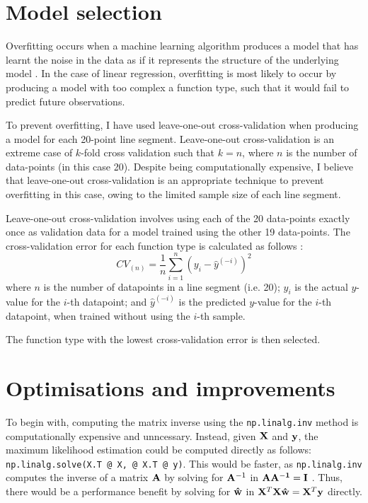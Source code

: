 \documentclass[onecolumn, 12pt, a4paper]{article}
\begin{document}
\section{Model selection}

Overfitting occurs when a machine learning algorithm
produces a model that has learnt the noise in the data
as if it represents the structure of the underlying
model \cite{MSMI}.
In the case of linear regression, overfitting is most
likely to occur by producing a model with too complex a function
type, such that it would fail to predict future observations.

To prevent overfitting, I have used leave-one-out
cross-validation when producing a model for each 20-point
line segment. Leave-one-out cross-validation is 
an extreme case of $k$-fold cross validation
such that $k = n$, where
$n$ is the number of data-points (in this case 20).
Despite being computationally expensive, I believe that
leave-one-out cross-validation is an appropriate technique
to prevent overfitting in this case,
owing to the limited sample size of each line segment.

Leave-one-out cross-validation involves using each of
the 20 data-points exactly once as validation data for a model
trained using the other 19 data-points. 
The cross-validation error for each function type is calculated
as follows \cite{Stanford}:
\[
    CV_{(n)} = \frac{1}{n} \sum_{i = 1}^{n} (y_{i} - \hat{y}^{(-i)})^{2}
\]
where
$n$ is the number of datapoints in a line segment (i.e. 20);
$y_{i}$ is the actual $y$-value for the $i$-th datapoint;
and $\hat{y}^{(-i)}$ is the predicted $y$-value for the $i$-th
datapoint, when trained without using the $i$-th sample.

The function type with the lowest cross-validation error is then selected.

\section{Optimisations and improvements}

To begin with,
computing the matrix inverse using the \texttt{np.linalg.inv}
method is computationally expensive and unncessary.
Instead, given $\vb{X}$ and $\vb{y}$, the maximum likelihood
estimation could be computed directly as follows:
\texttt{np.linalg.solve(X.T @ X, @ X.T @ y)}.
This would be faster, as \texttt{np.linalg.inv}
computes the inverse of a matrix $\vb{A}$ by solving for $\vb{A}^{-1}$
in $\vb{AA^{-1} = I}$ \cite{StackOverflow}.
Thus, there would be a performance benefit by solving for
$\vb{\hat{w}}$ in
$\vb{X}^{T} \vb{X} \vb{\hat{w}} = \vb{X}^{T} \vb{y}$ directly.
\end{document}
